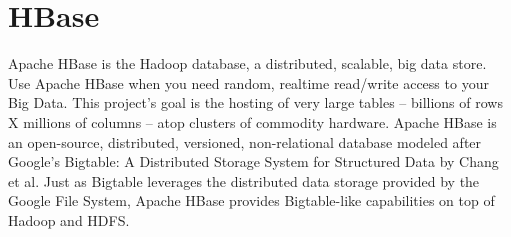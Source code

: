 \section{HBase}

Apache HBase\cite{hid-sp18-515-www-hbase} is the Hadoop database, 
a distributed, scalable, big data store. 
Use Apache HBase when you need random, realtime read/write access 
to your Big Data. This project's goal is the hosting of very large 
tables -- billions of rows X millions of columns -- atop clusters of 
commodity hardware. Apache HBase is an open-source, distributed, 
versioned, non-relational database modeled after Google's Bigtable: 
A Distributed Storage System for Structured Data by Chang et al. Just
as Bigtable leverages the distributed data storage provided by the 
Google File System, Apache HBase provides Bigtable-like capabilities 
on top of Hadoop and HDFS. 
